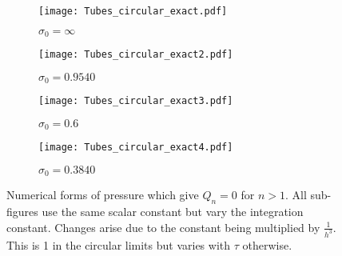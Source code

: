\documentclass[12pt]{article}
\begin{document}
\newpage
\begin{figure}[htbp]
  \centering
  \begin{subfigure}[b]{0.45\textwidth}
    \texttt{[image: Tubes\_circular\_exact.pdf]}
    \caption*{$\sigma_0=\infty$}
  \end{subfigure}
  \begin{subfigure}[b]{0.45\textwidth}
    \texttt{[image: Tubes\_circular\_exact2.pdf]}
    \caption*{$\sigma_0=0.9540$}
  \end{subfigure}
  \begin{subfigure}[b]{0.45\textwidth}
    \texttt{[image: Tubes\_circular\_exact3.pdf]}
    \caption*{$\sigma_0=0.6$}
  \end{subfigure}
  \begin{subfigure}[b]{0.45\textwidth}
    \texttt{[image: Tubes\_circular\_exact4.pdf]}
    \caption*{$\sigma_0=0.3840$}
  \end{subfigure}
  \caption{Numerical forms of pressure which give $Q_n=0$ for $n>1$. All sub-figures use the same scalar constant but vary the integration constant. Changes arise due to the constant being multiplied by $\frac{1}{h^3}$. This is 1 in the circular limits but varies with $\tau$ otherwise.}
  \label{fig:six-graphs}
\end{figure}

\newpage
\end{document}
